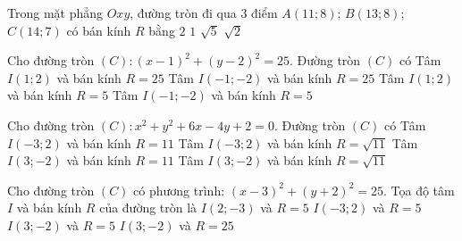 \begin{ex}%
	Trong mặt phẳng $Oxy$, đường tròn đi qua $3$ điểm $A(11; 8)$; $ B(13;8)$; $C(14;7)$ có bán kính  $R$ bằng
	\choice 
		{$2$} 
		{$1$} 
		 {\True $\sqrt{5}$}
		 {$\sqrt{2}$}
\end{ex}

\begin{ex}%
	Cho đường tròn $(C)\colon (x-1)^2+(y-2)^2=25$.  Đường tròn $(C)$ có
	\choice 
		{Tâm $I(1;2)$ và bán kính  $R=25$}
		{Tâm $I(-1;-2)$ và bán kính  $R=25$}
		 {\True Tâm $I(1;2)$ và bán kính $R=5$}
		{Tâm  $I(-1;-2)$ và bán kính $R=5$}
\end{ex}

\begin{ex}%
	Cho đường tròn $(C)\colon x^2+y^2+6x-4y+2=0$. Đường tròn  $(C)$ có
	 \choice
		{Tâm $I(-3;2)$ và bán kính $R=11$} 
		{\True Tâm  $I(-3;2)$ và bán kính $R=\sqrt{11}$}
		 {Tâm $I(3;-2)$ và bán kính $R=11$}
		{Tâm $I(3;-2)$ và  bán kính $R=\sqrt{11}$}
\end{ex}




\begin{ex}%
	Cho đường tròn $(C)$ có phương trình: $(x-3)^2+(y+2)^2=25$. Tọa độ tâm $I$ và bán kính $R$ của đường tròn là
	\choice 
		{$I(2;-3)$ và $R=5$}
		{$I(-3;2)$ và $R=5$} 
		{\True $I(3;-2)$ và $R=5$}
		{$I(3;-2)$ và $R=25$}
\end{ex}

